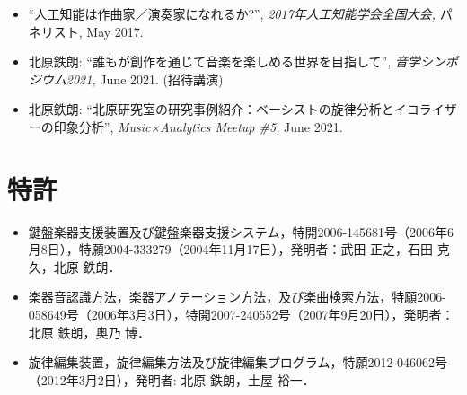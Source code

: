 \begin{itemize}
\item 

    ``人工知能は作曲家／演奏家になれるか?'', 
    {\it 2017年人工知能学会全国大会,
    } パネリスト, May 2017. 

\item 
北原鉄朗: 
    ``誰もが創作を通じて音楽を楽しめる世界を目指して'', 
    {\it 音学シンポジウム2021,
    } June 2021. 
(招待講演)
\item 
北原鉄朗: 
    ``北原研究室の研究事例紹介：ベーシストの旋律分析とイコライザーの印象分析'', 
    {\it Music×Analytics Meetup \#5,
    } June 2021. 

   \end{itemize}
 
\section*{特許}
\begin{itemize}
  
\item 
鍵盤楽器支援装置及び鍵盤楽器支援システム，特開2006-145681号（2006年6月8日），特願2004-333279（2004年11月17日），発明者：武田 正之，石田
      克久，北原 鉄朗．\par

\item 
楽器音認識方法，楽器アノテーション方法，及び楽曲検索方法，特願2006-058649号（2006年3月3日），特開2007-240552号（2007年9月20日），発明者：北原
      鉄朗，奥乃 博． \par

\item 
旋律編集装置，旋律編集方法及び旋律編集プログラム，特願2012-046062号（2012年3月2日），発明者: 北原 鉄朗，土屋 裕一．\par

\end{itemize}

